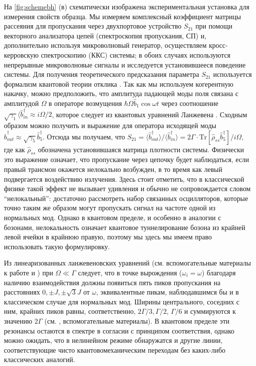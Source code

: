 \documentclass[14pt, a4paper]{extreport}
\newcommand{\Tr}{\text{Tr}}
\numberwithin{equation}{section}
\begin{document}
На \autoref{fig:schemebh} (в) схематически изображена экспериментальная установка для измерения свойств образца. Мы измеряем комплексный коэффициент матрицы рассеяния для пропускания через двухпортовое устройство $S_{21}$ при помощи векторного анализатора цепей (спектроскопия пропускания, СП) и, дополнительно используя микроволновый генератор, осуществляем кросс-керровскую спектроскопию (ККС) системы; в обоих случаях используются непрерывные микроволновые сигналы и исследуется установившееся поведение системы. Для получения теоретического предсказания параметра $S_{21}$ используется формализм квантовой теории отклика \cite{yurke1984quantum,collett1984squeezing, gardiner1985input, fedorov2015}. Так как мы используем когерентную накачку, можно предположить, что амплитуда падающей моды поля связана с амплитудой $\Omega$ в операторе возмущения $\hbar \Omega \hat b_1 \cos \omega t$ через соотношение $\sqrt{\gamma_1} \langle\hat b_{in}^\dag \approx i\Omega/2$, которое следует из квантовых уравнений Ланжевена \cite{mirhosseini2019cavity}. Сходным образом можно получить и выражение для оператора исходящей моды $\hat b_{out}^\dag \approx \sqrt{\gamma_5}\hat b_5^\dag$. Отсюда мы получаем, что $S_{21} = \langle \hat b_{out}^\dag\rangle / \langle \hat b_{in}^\dag \rangle = 2\Gamma\cdot \Tr[\hat \rho_{ss} \hat b_5^\dag]/{i\Omega} ,$ где как $\hat \rho_{ss}$ обозначена установившаяся матрица плотности системы. Физически это выражение означает, что пропускание через цепочку будет наблюдаться, если правый трансмон окажется нелокально возбужден, в то время как левый подвергается воздействию излучения. Здесь стоит отметить, что в классической физике такой эффект не вызывает удивления и обычно не сопровождается словом ``нелокальный'': достаточно рассмотреть набор связанных осцилляторов, которые точно таким же образом могут пропускать сигнал на частоте одной из нормальных мод. Однако в квантовом пределе, и особенно в аналогии с бозонами, нелокальность означает квантовое туннелирование бозона из крайней левой ячейки в крайнюю правую, поэтому мы здесь мы имеем право использовать такую формулировку.

Из линеаризованных ланжевеновских уравнений (см. вспомогательные материалы к работе \cite{fedorov2021photon} и \cite{astafiev2010resonance}) при $\Omega \ll \Gamma$ следует, что в точке вырождения ($\omega_i = \omega$) благодаря наличию взаимодействия должны появиться пять пиков пропускания на расстояниях $0, \pm J, \pm \sqrt 3 J$ от $\omega$, эквивалентные пикам, наблюдавшимся бы и в классическом случае для нормальных мод. Ширины центрального, соседних с ним, крайних пиков равны, соответственно, $2\Gamma/3, \Gamma/2$, $\Gamma/6$ и суммируются к значению $2\Gamma$ (см. \cite{fedorov2021photon}, вспомогательные материалы). В квантовом пределе эти резонансы остаются в спектре в согласии с принципом соответствия, однако можно ожидать, что в нелинейном режиме обнаружатся и другие линии, соответствующие чисто квантовомеханическим переходам без каких-либо классических аналогий.
\end{document}
